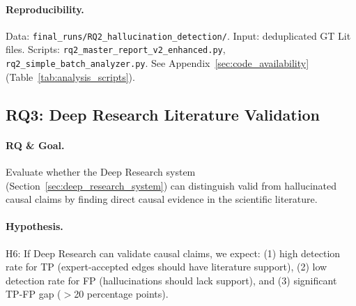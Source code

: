 \paragraph{Reproducibility.}
Data: \texttt{final\_runs/RQ2\_hallucination\_detection/}. Input: deduplicated GT Lit files. Scripts: \texttt{rq2\_master\_report\_v2\_enhanced.py}, \texttt{rq2\_simple\_batch\_analyzer.py}. See Appendix~\ref{sec:code_availability} (Table~\ref{tab:analysis_scripts}).
    
\subsection{RQ3: Deep Research Literature Validation}
\label{sec:rq3_experiments}

\begin{center}
\end{center}

\vspace{0.5em}

\paragraph{RQ \& Goal.}
Evaluate whether the Deep Research system (Section~\ref{sec:deep_research_system}) can distinguish valid from hallucinated causal claims by finding direct causal evidence in the scientific literature.

\paragraph{Hypothesis.}
H6: If Deep Research can validate causal claims, we expect: (1) high detection rate for TP (expert-accepted edges should have literature support), (2) low detection rate for FP (hallucinations should lack support), and (3) significant TP-FP gap ($>$20 percentage points).

